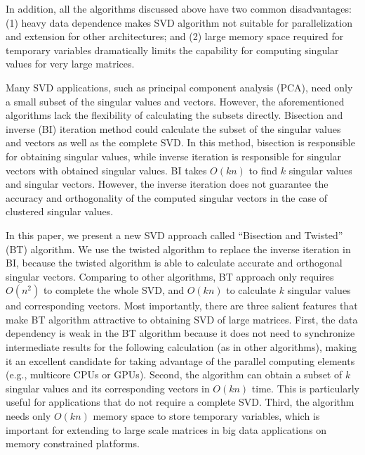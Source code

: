 In addition, all the algorithms discussed above have two common disadvantages:
(1) heavy data dependence makes SVD algorithm not suitable for parallelization and extension for other architectures; and
(2) large memory space required for temporary variables
dramatically limits the capability for computing singular values for very large matrices.

Many SVD applications, such as principal component
analysis (PCA), need only a small subset of the singular values and
vectors. However, the aforementioned algorithms lack the flexibility of calculating the subsets directly.
Bisection and inverse (BI) iteration method could calculate the subset of the singular values and vectors\cite{95ETNAbisecion} as well as the complete SVD.
In this method, bisection is responsible for obtaining singular
values, while inverse iteration is responsible for singular vectors
with obtained singular values.
BI takes $O(kn)$ to find $k$ singular values and singular vectors. 
However, the inverse iteration does not guarantee the accuracy and orthogonality of the computed singular vectors in the case of clustered singular values.

In this paper, we present a new SVD approach called ``Bisection and Twisted'' (BT) algorithm. We use the twisted algorithm \cite{09NLAAtwisted} to replace the inverse iteration in BI, because the twisted algorithm is able to calculate accurate and orthogonal singular vectors. 
Comparing to other algorithms, BT approach only requires $O(n^2)$ to complete the whole SVD\cite{09NLAAtwisted,05UCB}, and $O(kn)$ to calculate $k$ singular values and corresponding vectors.
Most importantly, there are three salient features that make BT algorithm attractive
to obtaining SVD of large matrices. First, the data dependency is weak in the BT algorithm because it does not need to synchronize intermediate results for the following calculation (as in other algorithms),
making it an excellent candidate for taking advantage of the parallel computing
elements (e.g., multicore CPUs or GPUs). Second, 
the algorithm can obtain a subset of $k$ singular values and its corresponding vectors in $O(kn)$ time. This is particularly useful for applications that
do not require a complete SVD.
Third, the algorithm needs only $O(kn)$ memory space to store
temporary variables, which is important for extending to large scale
matrices in big data applications on memory constrained platforms.


